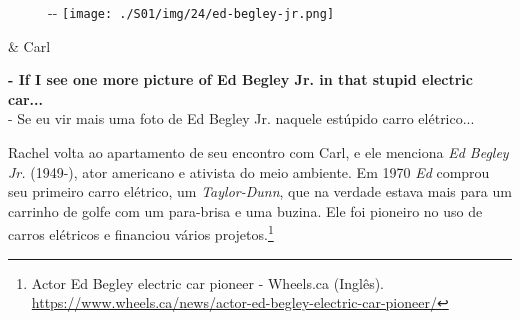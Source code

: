 \begin{figure}[!ht]
  \begin{adjustwidth}{-\oddsidemargin-1in}{-\rightmargin}
    \centering
    \texttt{[image: ./S01/img/24/ed-begley-jr.png]}
  \end{adjustwidth}
\end{figure}

\begin{tcolorbox}[enhanced,center upper,
    drop fuzzy shadow southeast, boxrule=0.3pt,
    lower separated=false, breakable,
    colframe=black!30!dialogoBorder,colback=white]
\begin{minipage}[c]{0.16\linewidth}
   & \centering \scriptsize{Carl}
\end{minipage}
\hfill
\begin{minipage}[c]{0.8\linewidth}
  \textbf{- If I see one more picture of Ed Begley Jr. in that stupid electric car...}\\
  - Se eu vir mais uma foto de Ed Begley Jr. naquele estúpido carro elétrico...
\end{minipage}
\end{tcolorbox}

Rachel volta ao apartamento de seu encontro com Carl, e ele menciona
\emph{Ed Begley Jr.} (1949-), ator americano e ativista do meio
ambiente. Em 1970 \emph{Ed} comprou seu primeiro carro elétrico, um
\emph{Taylor-Dunn}, que na verdade estava mais para um carrinho de golfe
com um para-brisa e uma buzina. Ele foi pioneiro no uso de carros
elétricos e financiou vários projetos.\footnote{\sloppy Actor Ed Begley electric car pioneer - Wheels.ca (Inglês). \url{https://www.wheels.ca/news/actor-ed-begley-electric-car-pioneer/}}
